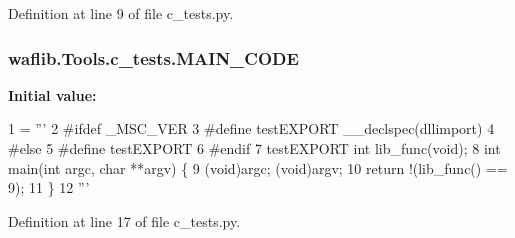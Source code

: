 Definition at line 9 of file c\+\_\+tests.\+py.

\subsubsection[{\texorpdfstring{M\+A\+I\+N\+\_\+\+C\+O\+DE}{MAIN_CODE}}]{ waflib.\+Tools.\+c\+\_\+tests.\+M\+A\+I\+N\+\_\+\+C\+O\+DE}\hypertarget{namespacewaflib_1_1_tools_1_1c__tests_a24e46dceb7dade3c3b2a74f62a366105}{}\label{namespacewaflib_1_1_tools_1_1c__tests_a24e46dceb7dade3c3b2a74f62a366105}
{\bfseries Initial value\+:}
\begin{DoxyCode}
1 = \textcolor{stringliteral}{'''}
2 \textcolor{stringliteral}{#ifdef \_MSC\_VER}
3 \textcolor{stringliteral}{#define testEXPORT \_\_declspec(dllimport)}
4 \textcolor{stringliteral}{#else}
5 \textcolor{stringliteral}{#define testEXPORT}
6 \textcolor{stringliteral}{#endif}
7 \textcolor{stringliteral}{testEXPORT int lib\_func(void);}
8 \textcolor{stringliteral}{int main(int argc, char **argv) \{}
9 \textcolor{stringliteral}{    (void)argc; (void)argv;}
10 \textcolor{stringliteral}{    return !(lib\_func() == 9);}
11 \textcolor{stringliteral}{\}}
12 \textcolor{stringliteral}{'''}
\end{DoxyCode}


Definition at line 17 of file c\+\_\+tests.\+py.


